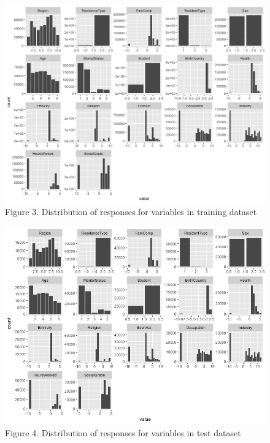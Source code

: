 \documentclass[]{book}
\begin{document}
\begin{figure}
\centering
\includegraphics{images/dist_train.png}
\caption{Figure 3. Distribution of responses for variables in training
dataset}
\end{figure}

\begin{figure}
\centering
\includegraphics{images/dist_test.png}
\caption{Figure 4. Distribution of responses for variables in test
dataset}
\end{figure}
\end{document}
